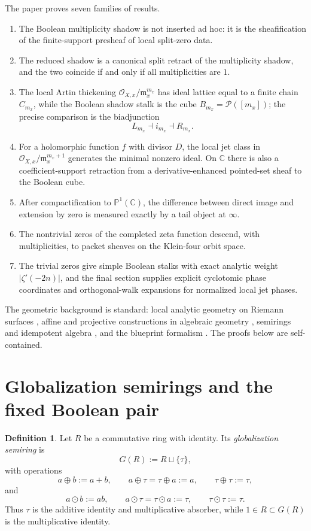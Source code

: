 \documentclass[11pt,a4paper]{article}
\numberwithin{equation}{section}
\theoremstyle{definition}
\newtheorem{definition}[theorem]{Definition}
\theoremstyle{remark}
\newcommand{\CC}{\mathbb C}
\newcommand{\PP}{\mathbb P}
\newcommand{\cO}{\mathcal O}
\newcommand{\cP}{\mathcal P}
\newcommand{\taup}{\tau}
\begin{document}
The paper proves seven families of results.

\begin{enumerate}[label=(\arabic*)]
\item The Boolean multiplicity shadow is not inserted ad hoc: it is the sheafification of the finite-support presheaf of local split-zero data.
\item The reduced shadow is a canonical split retract of the multiplicity shadow, and the two coincide if and only if all multiplicities are $1$.
\item The local Artin thickening $\cO_{X,x}/\mathfrak m_x^{m_x}$ has ideal lattice equal to a finite chain $C_{m_x}$, while the Boolean shadow stalk is the cube $B_{m_x}=\cP([m_x])$; the precise comparison is the biadjunction
\[
L_{m_x}\dashv i_{m_x}\dashv R_{m_x}.
\]
\item For a holomorphic function $f$ with divisor $D$, the local jet class in $\cO_{X,x}/\mathfrak m_x^{m_x+1}$ generates the minimal nonzero ideal.  On $\CC$ there is also a coefficient-support retraction from a derivative-enhanced pointed-set sheaf to the Boolean cube.
\item After compactification to $\PP^1(\CC)$, the difference between direct image and extension by zero is measured exactly by a tail object at $\infty$.
\item The nontrivial zeros of the completed zeta function descend, with multiplicities, to packet sheaves on the Klein-four orbit space.
\item The trivial zeros give simple Boolean stalks with exact analytic weight $|\zeta'(-2n)|$, and the final section supplies explicit cyclotomic phase coordinates and orthogonal-walk expansions for normalized local jet phases.
\end{enumerate}

The geometric background is standard: local analytic geometry on Riemann surfaces \cite{Lee}, affine and projective constructions in algebraic geometry \cite{GrothendieckEGAII,Vakil,OrecchiaChiantini}, semirings and idempotent algebra \cite{GaubertKatz,Gunawardena,DrosteKuichVogler}, and the blueprint formalism \cite{Lorscheid}.  The proofs below are self-contained.

\section{Globalization semirings and the fixed Boolean pair}

\begin{definition}
Let $R$ be a commutative ring with identity.  Its \emph{globalization semiring} is
\[
G(R):=R\sqcup\{\taup\},
\]
with operations
\[
a\oplus b:=a+b,\qquad a\oplus\taup=\taup\oplus a:=a,\qquad \taup\oplus\taup:=\taup,
\]
and
\[
a\odot b:=ab,\qquad a\odot\taup=\taup\odot a:=\taup,\qquad \taup\odot\taup:=\taup.
\]
Thus $\taup$ is the additive identity and multiplicative absorber, while $1\in R\subset G(R)$ is the multiplicative identity.
\end{definition}
\end{document}
